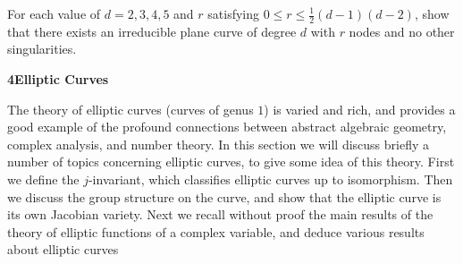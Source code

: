 {{\begin{description}[style=multiline,labelwidth=2.55em,leftmargin=2.85em,itemsep=4pt,topsep=0pt,parsep=0pt]
\begin{parts}
\end{parts}
\item[\hypertarget{ex-IV-3.12}{}3.12.] For each value of $d=2,3,4,5$ and $r$ satisfying $0\le r\le\frac12(d-1)(d-2)$, show that there exists an irreducible plane curve of degree $d$ with $r$ nodes and no other singularities.
\end{description}
}

\bigskip
\noindent\hypertarget{sec-IV-4}{}\textbf{\large 4\quad Elliptic Curves}\par\medskip

\noindent The theory of elliptic curves (curves of genus $1$) is varied and rich, and provides a good example of the profound connections between abstract algebraic geometry, complex analysis, and number theory. In this section we will discuss briefly a number of topics concerning elliptic curves, to give some idea of this theory. First we define the $j$-invariant, which classifies elliptic curves up to isomorphism. Then we discuss the group structure on the curve, and show that the elliptic curve is its own Jacobian variety. Next we recall without proof the main results of the theory of elliptic functions of a complex variable, and deduce various results about elliptic curves
}
